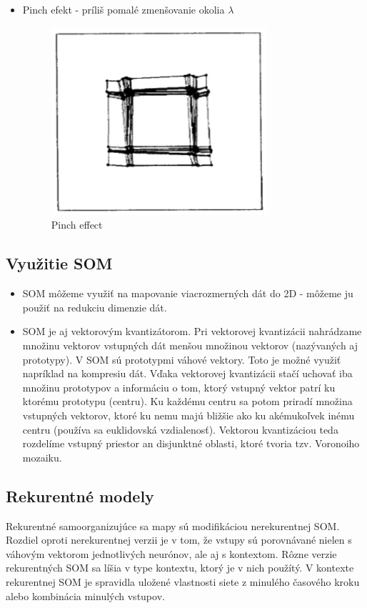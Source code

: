 \begin{itemize}
	\item Pinch efekt - príliš pomalé zmenšovanie okolia $\lambda$
	\begin{figure}[H]
		\centering
		\includegraphics[width=8cm]{assets/pinch_effect}
		\caption{Pinch effect}
	\end{figure}
\end{itemize}

\subsection{Využitie SOM}
\begin{itemize}
\item SOM môžeme využiť na mapovanie viacrozmerných dát do 2D - môžeme ju použiť na redukciu dimenzie dát.
\item SOM je aj vektorovým kvantizátorom. Pri vektorovej kvantizácii nahrádzame množinu vektorov vstupných dát menšou množinou vektorov (nazývaných aj prototypy). V SOM sú prototypmi
		váhové vektory. Toto je možné využiť napríklad na kompresiu dát. Vďaka vektorovej kvantizácii stačí uchovať iba množinu prototypov a informáciu o tom, ktorý vstupný vektor patrí 
		ku ktorému prototypu (centru). Ku každému centru sa potom priradí množina vstupných vektorov, ktoré ku nemu majú bližšie ako ku akémukoľvek inému centru (používa sa euklidovská vzdialenosť).
		Vektorou kvantizáciou teda rozdelíme vstupný priestor an disjunktné oblasti, ktoré tvoria tzv. Voronoiho mozaiku.
\end{itemize}


\subsection{Rekurentné modely}
Rekurentné samoorganizujúce sa mapy sú modifikáciou nerekurentnej SOM.
Rozdiel oproti nerekurentnej verzii je v tom, že vstupy sú porovnávané
nielen s váhovým vektorom jednotlivých neurónov, ale aj s kontextom.
Rôzne verzie rekurentných SOM sa líšia v type kontextu, ktorý je v nich použítý. 
V kontexte rekurentnej SOM je spravidla uložené vlastnosti siete z minulého časového kroku alebo kombinácia minulých vstupov.

